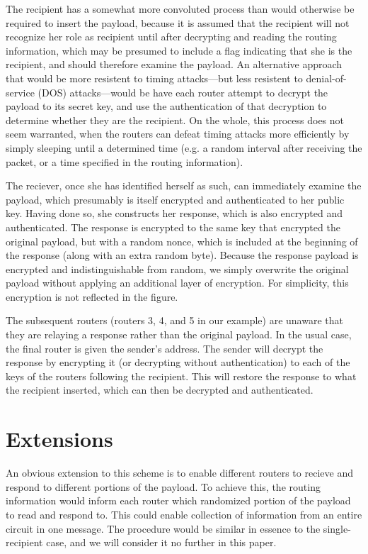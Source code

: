 \documentclass[letterpaper,twocolumn,amsmath,amssymb,pre,aps,10pt]{revtex4-1}
\begin{document}
The recipient has a somewhat more convoluted process than would
otherwise be required to insert the payload, because it is assumed
that the recipient will not recognize her role as recipient until
after decrypting and reading the routing information, which may be
presumed to include a flag indicating that she is the recipient, and
should therefore examine the payload.  An alternative approach that
would be more resistent to timing attacks---but less resistent to
denial-of-service (DOS) attacks---would be have each router attempt to
decrypt the payload to its secret key, and use the authentication of
that decryption to determine whether they are the recipient.  On the
whole, this process does not seem warranted, when the routers can
defeat timing attacks more efficiently by simply sleeping until a
determined time (e.g. a random interval after receiving the packet, or
a time specified in the routing information).

The reciever, once she has identified herself as such, can immediately
examine the payload, which presumably is itself encrypted and
authenticated to her public key.  Having done so, she constructs her
response, which is also encrypted and authenticated.  The response is
encrypted to the same key that encrypted the original payload, but
with a random nonce, which is included at the beginning of the
response (along with an extra random byte).  Because the response
payload is encrypted and indistinguishable from random, we simply
overwrite the original payload without applying an additional layer of
encryption.  For simplicity, this encryption is not reflected in the
figure.

The subsequent routers (routers 3, 4, and 5 in our example) are
unaware that they are relaying a response rather than the original
payload.  In the usual case, the final router is given the sender's
address.  The sender will decrypt the response by encrypting it (or
decrypting without authentication) to each of the keys of the routers
following the recipient.  This will restore the response to what the
recipient inserted, which can then be decrypted and authenticated.

\section{Extensions}

An obvious extension to this scheme is to enable different routers to
recieve and respond to different portions of the payload.  To achieve
this, the routing information would inform each router which
randomized portion of the payload to read and respond to. This could
enable collection of information from an entire circuit in one
message.  The procedure would be similar in essence to the
single-recipient case, and we will consider it no further in this
paper.
\end{document}
